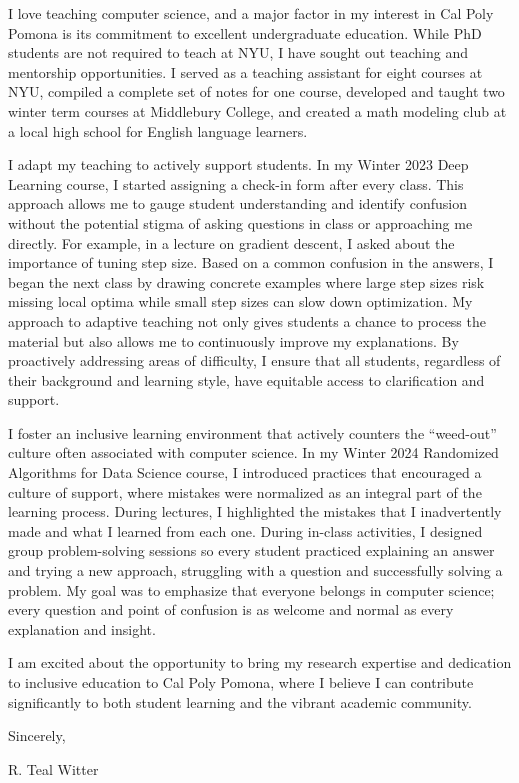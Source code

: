 \documentclass[11pt]{article}
\begin{document}
{I love teaching computer science, and a major factor in my interest in Cal Poly Pomona is its commitment to excellent undergraduate education. While PhD students are not required to teach at NYU, I have sought out teaching and mentorship opportunities. I served as a teaching assistant for eight courses at NYU, compiled a complete set of notes for one course, developed and taught two winter term courses at Middlebury College, and created a math modeling club at a local high school for English language learners.

I adapt my teaching to actively support students. In my Winter 2023 Deep Learning course, I started assigning a check-in form after every class. This approach allows me to gauge student understanding and identify confusion without the potential stigma of asking questions in class or approaching me directly. For example, in a lecture on gradient descent, I asked about the importance of tuning step size. Based on a common confusion in the answers, I began the next class by drawing concrete examples where large step sizes risk missing local optima while small step sizes can slow down optimization. My approach to adaptive teaching not only gives students a chance to process the material but also allows me to continuously improve my explanations. By proactively addressing areas of difficulty, I ensure that all students, regardless of their background and learning style, have equitable access to clarification and support.

I foster an inclusive learning environment that actively counters the “weed-out” culture often associated with computer science. In my Winter 2024 Randomized Algorithms for Data Science course, I introduced practices that encouraged a culture of support, where mistakes were normalized as an integral part of the learning process. During lectures, I highlighted the mistakes that I inadvertently made and what I learned from each one. During in-class activities, I designed group problem-solving sessions so every student practiced explaining an answer and trying a new approach, struggling with a question and successfully solving a problem. My goal was to emphasize that everyone belongs in computer science; every question and point of confusion is as welcome and normal as every explanation and insight.

I am excited about the opportunity to bring my research expertise and dedication to inclusive education to Cal Poly Pomona, where I believe I can contribute significantly to both student learning and the vibrant academic community.

Sincerely,

\vspace{1em}

{\cursive R. Teal Witter}

}
\end{document}
